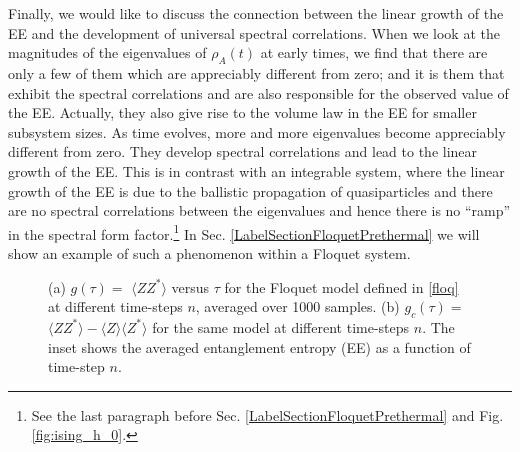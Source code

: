 \documentclass[aps,prb,preprint,onecolumn,amsmath,amssymb,superscriptaddress,eqsecnum,floatfix,scrartcl]{revtex4-1}
\begin{document}
Finally, we would like to discuss the connection between the linear growth of the  EE and the development
of universal  spectral correlations.
When we 
look at the
magnitudes  of  the eigenvalues  of $\rho_A(t)$ at early times, we
find that there are only
a few of them which
are appreciably different from zero;
and it is them that
exhibit the spectral correlations
and are also responsible for the observed  value of the EE. 
Actually, they also give rise to the volume law  in the EE for  smaller subsystem sizes.
As time evolves, more and more eigenvalues become appreciably different from zero.
They develop spectral
correlations and lead to the linear growth of the EE. This is in contrast with 
an
integrable system, where the linear growth of the  EE is due to the ballistic propagation of quasiparticles\cite{Calabrese2007}
 and there are no spectral correlations
between the eigenvalues and hence there is  no ``ramp'' in the spectral form factor.\footnote{See the last paragraph
before Sec. \ref{LabelSectionFloquetPrethermal} and Fig. \ref{fig:ising_h_0}.} 
In Sec. \ref{LabelSectionFloquetPrethermal}
we will show an example of such a phenomenon within a Floquet system.





\begin{figure}[hbt]
\centering
\caption{
(a) $g(\tau)=$ $\langle ZZ^*\rangle$ versus $\tau$ for the Floquet model defined in \eqref{floq} at different time-steps $n$,  averaged over 1000 samples. (b) $g_c(\tau)=$  $\langle ZZ^*\rangle-\langle Z\rangle\langle Z^*\rangle$ for the same model at different time-steps $n$. 
The inset shows
the averaged 
entanglement entropy (EE) as a function of time-step $n$.
 } 
\label{fig:floq}
\end{figure}
\end{document}
